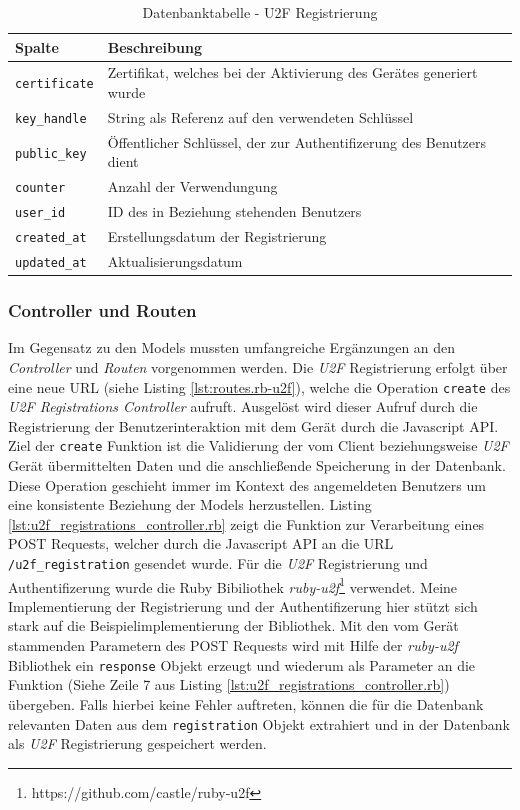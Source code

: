 \documentclass[11pt,a4paper,ngerman]{scrreprt}
\begin{document}
\begin{table}[htbp]
    \begin{tabularx}{\textwidth}{ lX }
        \toprule
        Spalte & Beschreibung \\ 
        \midrule
        \texttt{certificate} & Zertifikat, welches bei der Aktivierung des Gerätes generiert wurde \\
        \texttt{key\_handle} & String als Referenz auf den verwendeten Schlüssel \\
        \texttt{public\_key} & Öffentlicher Schlüssel, der zur Authentifizerung des Benutzers dient \\
        \texttt{counter} & Anzahl der Verwendungung \\
        \texttt{user\_id} & ID des in Beziehung stehenden Benutzers \\
        \texttt{created\_at} & Erstellungsdatum der Registrierung \\
        \texttt{updated\_at} & Aktualisierungsdatum \\
        \bottomrule
    \end{tabularx}
    \caption{Datenbanktabelle - U2F Registrierung}
    \label{table:db-u2f}
\end{table}
\clearpage
\subsubsection{Controller und Routen}
Im Gegensatz zu den Models mussten umfangreiche Ergänzungen an den \textit{Controller} und \textit{Routen} vorgenommen werden. Die \textit{U2F} Registrierung erfolgt über eine neue URL (siehe Listing \ref{lst:routes.rb-u2f}), welche die Operation \texttt{create} des \textit{U2F Registrations Controller} aufruft. Ausgelöst wird dieser Aufruf durch die Registrierung der Benutzerinteraktion mit dem Gerät durch die Javascript API. Ziel der \texttt{create} Funktion ist die Validierung der vom Client beziehungsweise \textit{U2F} Gerät übermittelten Daten und die anschließende Speicherung in der Datenbank. Diese Operation geschieht immer im Kontext des angemeldeten Benutzers um eine konsistente Beziehung der Models herzustellen. Listing \ref{lst:u2f_registrations_controller.rb} zeigt die Funktion zur Verarbeitung eines POST Requests, welcher durch die Javascript API an die URL \texttt{/u2f\_registration} gesendet wurde. Für die \textit{U2F} Registrierung und Authentifizerung wurde die Ruby Bibiliothek \textit{ruby-u2f}\footnote{https://github.com/castle/ruby-u2f} verwendet. Meine Implementierung der Registrierung und der Authentifizerung hier stützt sich stark auf die Beispielimplementierung der Bibliothek. Mit den vom Gerät stammenden Parametern des POST Requests wird mit Hilfe der \textit{ruby-u2f} Bibliothek ein \texttt{response} Objekt erzeugt und wiederum als Parameter an die  Funktion (Siehe Zeile 7 aus Listing \ref{lst:u2f_registrations_controller.rb}) übergeben. Falls hierbei keine Fehler auftreten, können die für die Datenbank relevanten Daten aus dem \texttt{registration} Objekt extrahiert und in der Datenbank als \textit{U2F} Registrierung gespeichert werden.
\end{document}
